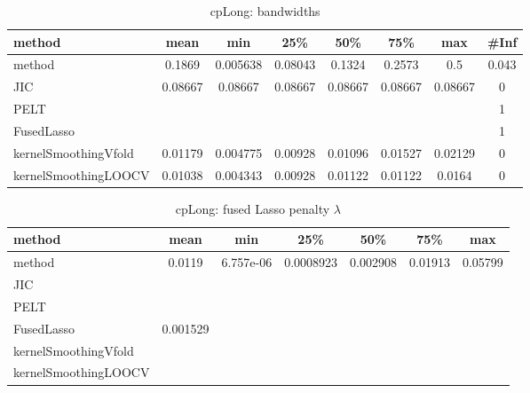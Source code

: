 \begin{table}[ht]
\centering
\begin{tabular}{l|c|ccccc|c}
  \hline
method & mean & min & 25\% & 50\% & 75\% & max & \#Inf \\ 
  \hline
method & 0.1869 & 0.005638 & 0.08043 & 0.1324 & 0.2573 &   0.5 & 0.043 \\ 
  JIC & 0.08667 & 0.08667 & 0.08667 & 0.08667 & 0.08667 & 0.08667 &   0 \\ 
  PELT &  &  &  &  &  &  &   1 \\ 
  FusedLasso &  &  &  &  &  &  &   1 \\ 
  kernelSmoothingVfold & 0.01179 & 0.004775 & 0.00928 & 0.01096 & 0.01527 & 0.02129 &   0 \\ 
  kernelSmoothingLOOCV & 0.01038 & 0.004343 & 0.00928 & 0.01122 & 0.01122 & 0.0164 &   0 \\ 
   \hline
\end{tabular}
\caption{cpLong: bandwidths} 
\label{tab:cpLongBandwidths}
\end{table}
\begin{table}[ht]
\centering
\begin{tabular}{l|c|ccccc}
  \hline
method & mean & min & 25\% & 50\% & 75\% & max \\ 
  \hline
method & 0.0119 & 6.757e-06 & 0.0008923 & 0.002908 & 0.01913 & 0.05799 \\ 
  JIC &  &  &  &  &  &  \\ 
  PELT &  &  &  &  &  &  \\ 
  FusedLasso & 0.001529 &  &  &  &  &  \\ 
  kernelSmoothingVfold &  &  &  &  &  &  \\ 
  kernelSmoothingLOOCV &  &  &  &  &  &  \\ 
   \hline
\end{tabular}
\caption{cpLong: fused Lasso penalty $\lambda$} 
\label{tab:cpLongLambdas}
\end{table}
